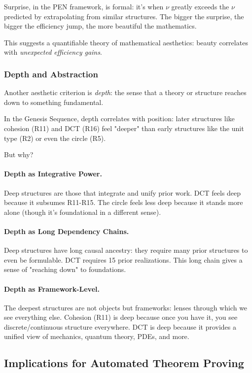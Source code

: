 \documentclass[11pt]{article}
\theoremstyle{definition}
\begin{document}
Surprise, in the PEN framework, is formal: it's when $\nu$ greatly exceeds the $\nu$ predicted by extrapolating from similar structures. The bigger the surprise, the bigger the efficiency jump, the more beautiful the mathematics.

This suggests a quantifiable theory of mathematical aesthetics: beauty correlates with \emph{unexpected efficiency gains}.

\subsubsection{Depth and Abstraction}

Another aesthetic criterion is \emph{depth}: the sense that a theory or structure reaches down to something fundamental.

In the Genesis Sequence, depth correlates with position: later structures like cohesion (R11) and DCT (R16) feel "deeper" than early structures like the unit type (R2) or even the circle (R5).

But why?

\paragraph{Depth as Integrative Power.}
Deep structures are those that integrate and unify prior work. DCT feels deep because it subsumes R11-R15. The circle feels less deep because it stands more alone (though it's foundational in a different sense).

\paragraph{Depth as Long Dependency Chains.}
Deep structures have long causal ancestry: they require many prior structures to even be formulable. DCT requires 15 prior realizations. This long chain gives a sense of "reaching down" to foundations.

\paragraph{Depth as Framework-Level.}
The deepest structures are not objects but frameworks: lenses through which we see everything else. Cohesion (R11) is deep because once you have it, you see discrete/continuous structure everywhere. DCT is deep because it provides a unified view of mechanics, quantum theory, PDEs, and more.

\subsection{Implications for Automated Theorem Proving}
\end{document}
